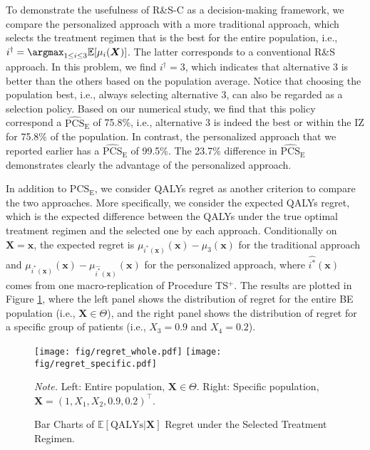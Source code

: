 \documentclass[ijoc,nonblindrev]{informs3}
\def\E{\mathbb{E}}
\def\bx{{\bm x}}
\def\bX{{\bm X}}
\def\PCSE{\mathrm{PCS}_{\mathrm{E}}}
\def\APCSE{\widehat{\mathrm{PCS}}_{\mathrm{E}}}
\begin{document}
To demonstrate the usefulness of R\&S-C as a decision-making framework, we compare the personalized approach
with a more traditional approach, which selects the treatment regimen that is the best for the entire population, i.e., $i^\dagger = \argmax_{1\leq i\leq 3} \E[\mu_i(\bX)]$.
The latter corresponds to a conventional R\&S approach.
In this problem, we find $i^\dagger=3$, which indicates that alternative 3 is better than the others based on the population average.
Notice that choosing the population best, i.e., always selecting alternative 3, can also be regarded as a selection policy.
Based on our numerical study, we find that this policy correspond a $\APCSE$ of 75.8\%, i.e., alternative 3 is indeed the best or within the IZ for 75.8\% of the population.
In contrast, the personalized approach that we reported earlier has a $\APCSE$ of 99.5\%.
The 23.7\% difference in $\APCSE$  demonstrates clearly the advantage of the personalized approach.



In addition to $\PCSE$, we consider QALYs regret as another criterion to compare the two approaches.
More specifically, we consider the expected QALYs regret,
which is the expected difference between the QALYs under the true optimal treatment regimen and the selected one by each approach.
Conditionally on $\bX=\bx$, the expected regret is $\mu_{i^*(\bx)}(\bx) - \mu_{3}(\bx)$ for the traditional approach and $\mu_{i^*(\bx)}(\bx) - \mu_{\widehat{i^*}(\bx)}(\bx)$ for the personalized approach,
where $\widehat{i^*}(\bx)$ comes from one macro-replication of Procedure TS$^+$.
The results are plotted in Figure \ref{fig-QALY-regret}, where the left panel shows the distribution of regret for the entire BE population (i.e., $\bX \in \Theta$),
and the right panel shows the distribution of regret for a specific group of patients (i.e., $X_3=0.9$ and $X_4=0.2$).

\begin{figure}[]
 \texttt{[image: fig/regret\_whole.pdf]}
\texttt{[image: fig/regret\_specific.pdf]}
\caption{Bar Charts of $\E[\mathrm{QALYs}|\bX]$ Regret under the Selected Treatment Regimen.}\label{fig-QALY-regret}
\begin{minipage}[t]{1\linewidth}
\SingleSpacedXI
\vspace{-1.2em}
\footnotesize{
\emph{Note.} \textsf{
Left: Entire population, $\bX \in \Theta$. Right: Specific population, $\bX=(1,X_1,X_2,0.9,0.2)^\intercal$.
}}
\end{minipage}
\end{figure}
\end{document}
